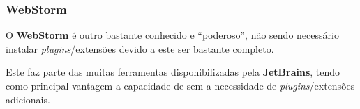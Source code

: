 \subsubsection{WebStorm}

\begin{minipage}{.3\textwidth}
\end{minipage}
\begin{minipage}{.7\textwidth}
	\minipagerestore
	O \textbf{WebStorm} é outro  bastante conhecido e ``poderoso'', não sendo necessário instalar \textit{plugins}/extensões devido a este ser bastante completo.

	Este  faz parte das muitas ferramentas disponibilizadas pela \textbf{JetBrains}, tendo como principal vantagem a capacidade de \textit{} sem a necessidade de \textit{plugins}/extensões adicionais.

\end{minipage}

